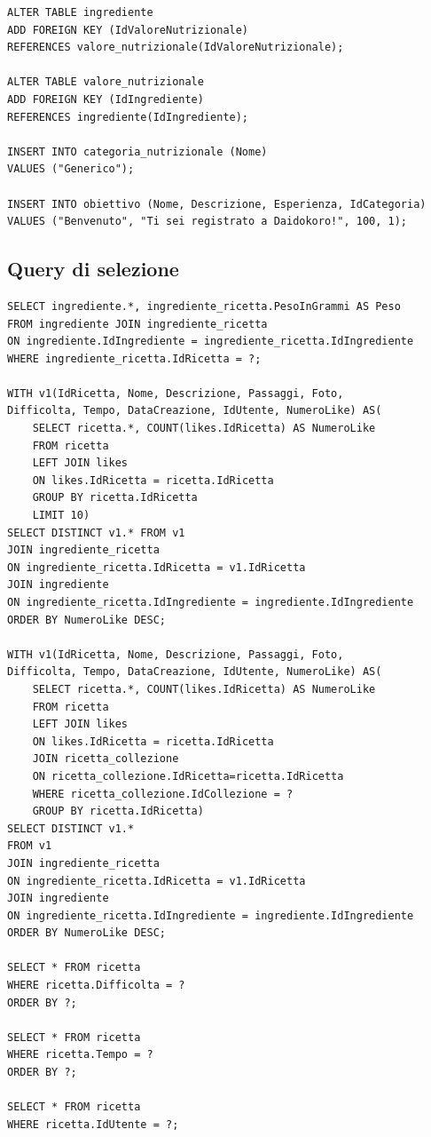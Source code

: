 ﻿\documentclass[a4paper,12pt]{report}
\begin{document}
\begin{verbatim}
ALTER TABLE ingrediente
ADD FOREIGN KEY (IdValoreNutrizionale)
REFERENCES valore_nutrizionale(IdValoreNutrizionale);

ALTER TABLE valore_nutrizionale
ADD FOREIGN KEY (IdIngrediente)
REFERENCES ingrediente(IdIngrediente);

INSERT INTO categoria_nutrizionale (Nome)
VALUES ("Generico");

INSERT INTO obiettivo (Nome, Descrizione, Esperienza, IdCategoria)
VALUES ("Benvenuto", "Ti sei registrato a Daidokoro!", 100, 1);
\end{verbatim}

\subsection{Query di selezione}
\begin{verbatim}
SELECT ingrediente.*, ingrediente_ricetta.PesoInGrammi AS Peso
FROM ingrediente JOIN ingrediente_ricetta
ON ingrediente.IdIngrediente = ingrediente_ricetta.IdIngrediente
WHERE ingrediente_ricetta.IdRicetta = ?;

WITH v1(IdRicetta, Nome, Descrizione, Passaggi, Foto,
Difficolta, Tempo, DataCreazione, IdUtente, NumeroLike) AS(
    SELECT ricetta.*, COUNT(likes.IdRicetta) AS NumeroLike
    FROM ricetta
    LEFT JOIN likes
    ON likes.IdRicetta = ricetta.IdRicetta
    GROUP BY ricetta.IdRicetta
    LIMIT 10)
SELECT DISTINCT v1.* FROM v1
JOIN ingrediente_ricetta
ON ingrediente_ricetta.IdRicetta = v1.IdRicetta
JOIN ingrediente
ON ingrediente_ricetta.IdIngrediente = ingrediente.IdIngrediente
ORDER BY NumeroLike DESC;

WITH v1(IdRicetta, Nome, Descrizione, Passaggi, Foto,
Difficolta, Tempo, DataCreazione, IdUtente, NumeroLike) AS(
    SELECT ricetta.*, COUNT(likes.IdRicetta) AS NumeroLike
    FROM ricetta
    LEFT JOIN likes
    ON likes.IdRicetta = ricetta.IdRicetta
    JOIN ricetta_collezione
    ON ricetta_collezione.IdRicetta=ricetta.IdRicetta
    WHERE ricetta_collezione.IdCollezione = ?
    GROUP BY ricetta.IdRicetta)
SELECT DISTINCT v1.*
FROM v1
JOIN ingrediente_ricetta
ON ingrediente_ricetta.IdRicetta = v1.IdRicetta
JOIN ingrediente
ON ingrediente_ricetta.IdIngrediente = ingrediente.IdIngrediente
ORDER BY NumeroLike DESC;

SELECT * FROM ricetta
WHERE ricetta.Difficolta = ?
ORDER BY ?;

SELECT * FROM ricetta
WHERE ricetta.Tempo = ?
ORDER BY ?;

SELECT * FROM ricetta
WHERE ricetta.IdUtente = ?;


\end{verbatim}
\end{document}
